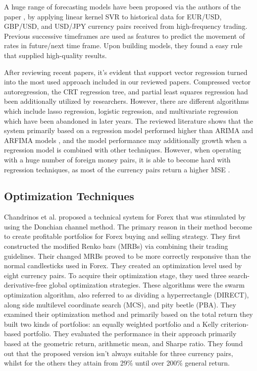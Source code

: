 A huge range of forecasting models have been proposed via the authors of the paper \cite{Serjam18}, by  applying linear kernel SVR to historical data for EUR/USD, GBP/USD, and USD/JPY currency pairs received from high-frequency trading. Previous successive timeframes are used as features to predict the movement of rates in future/next time frame. Upon building models, they found a easy rule that supplied high-quality results.

After reviewing recent papers, it's evident that support vector regression turned into the most used approach included in our reviewed papers. Compressed vector autoregression, the CRT regression tree, and partial least squares regression had been additionally utilized by researchers. However, there are different algorithms which include lasso regression, logistic regression, and multivariate regression which have been abandoned in later years. 
The reviewed literature shows that the system primarily based on a regression model performed higher than ARIMA and ARFIMA models \cite{Raimundo18}, and the model performance may additionally growth \cite{Achchab17} when a regression model is combined with other techniques. However, when operating with a huge number of foreign money pairs, it is able to become hard with regression techniques, as most of the currency pairs return a higher MSE \citep{Taveeapiradeecharoen19}.

\subsection{Optimization Techniques}
Chandrinos et al. \cite{Chandrinos18} proposed a technical system for Forex that was stimulated by using the Donchian channel method. The primary reason in their method become to create profitable portfolios for Forex buying and selling strategy. They first constructed the modified Renko bars (MRBs) via combining their trading guidelines. Their changed MRBs proved to be more correctly responsive than the normal candlesticks used in Forex. They created an optimization level used by eight currency pairs.  To acquire their optimization stage, they used three search-derivative-free global optimization strategies. These algorithms were the swarm optimization algorithm, also referred to as dividing a hyperrectangle (DIRECT), along side multilevel coordinate search (MCS), and pity beetle (PBA). They examined their optimization method and primarily based on the total return they built two kinds of portfolios: an equally weighted portfolio and a Kelly criterion-based portfolio. They evaluated the performance in their approach primarily based at the geometric return, arithmetic mean, and Sharpe ratio. They found out that the proposed version isn't always suitable for three currency pairs, whilst for the others they attain from 29\% until over 200\% general return.

